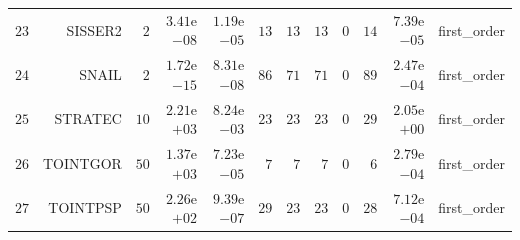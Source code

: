 \begin{longtable}{rrrrrrrrrrrr}
  \(    23\) & SISSER2 & \(     2\) & \( 3.41\)e\(-08\) & \( 1.19\)e\(-05\) & \(    13\) & \(    13\) & \(    13\) & \(     0\) & \(    14\) & \( 7.39\)e\(-05\) & first\_order \\
  \(    24\) & SNAIL & \(     2\) & \( 1.72\)e\(-15\) & \( 8.31\)e\(-08\) & \(    86\) & \(    71\) & \(    71\) & \(     0\) & \(    89\) & \( 2.47\)e\(-04\) & first\_order \\
  \(    25\) & STRATEC & \(    10\) & \( 2.21\)e\(+03\) & \( 8.24\)e\(-03\) & \(    23\) & \(    23\) & \(    23\) & \(     0\) & \(    29\) & \( 2.05\)e\(+00\) & first\_order \\
  \(    26\) & TOINTGOR & \(    50\) & \( 1.37\)e\(+03\) & \( 7.23\)e\(-05\) & \(     7\) & \(     7\) & \(     7\) & \(     0\) & \(     6\) & \( 2.79\)e\(-04\) & first\_order \\
  \(    27\) & TOINTPSP & \(    50\) & \( 2.26\)e\(+02\) & \( 9.39\)e\(-07\) & \(    29\) & \(    23\) & \(    23\) & \(     0\) & \(    28\) & \( 7.12\)e\(-04\) & first\_order \\\hline
\end{longtable}
